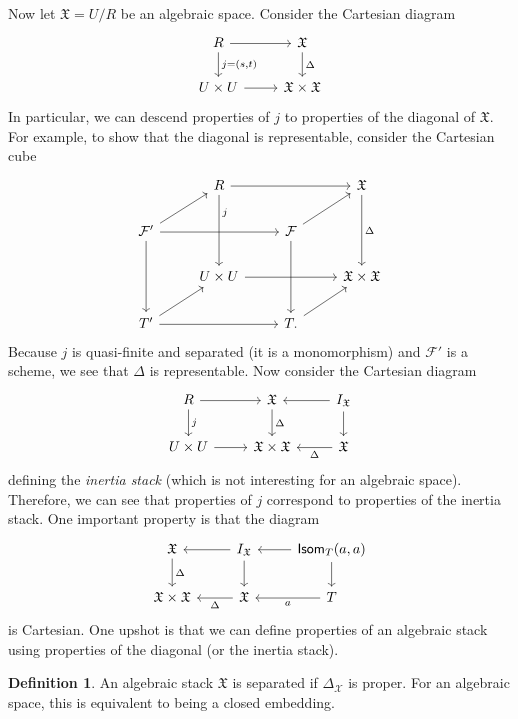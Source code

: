 \documentclass{amsart}
\theoremstyle{definition}
\newtheorem{defn}[thm]{Definition}
\theoremstyle{remark}
\theoremstyle{plain}
\theoremstyle{definition}
\theoremstyle{remark}
\newcommand{\mc}[1]{\mathcal{#1}}
\newcommand{\mf}[1]{\mathfrak{#1}}
\newcommand{\ms}[1]{\mathsf{#1}}
\newcommand{\1}{\mathbf{1}}
\newcommand{\2}{\mathbf{2}}
\newcommand{\3}{\mathbf{3}}
\begin{document}
Now let \(\mf{X} = U/R\) be an algebraic space. Consider the Cartesian diagram
\begin{equation*}
\begin{tikzcd}
    R \ar{r} \ar{d}{j=(s,t)} & \mf{X} \ar{d}{\Delta} \\
    U \times U \ar{r} & \mf{X} \times \mf{X}
\end{tikzcd}
\end{equation*}
In particular, we can descend properties of \(j\) to properties of the diagonal of \(\mf{X}\). For example, to show that the diagonal is representable, consider the Cartesian cube
\begin{equation*}
\begin{tikzcd}
    & R \ar{rr} \ar[dd,"j",near start] & & \mf{X} \ar{dd}{\Delta} \\
    \mc{F}' \ar{ur} \ar{rr} \ar{dd} & & \mc{F} \ar{ur} \ar{dd} \\
    & U \times U \ar{rr} & & \mf{X} \times \mf{X} \\
    T' \ar{ur} \ar{rr} & & T \ar{ur}.
\end{tikzcd}
\end{equation*}
Because \(j\) is quasi-finite and separated (it is a monomorphism) and \(\mc{F}'\) is a scheme, we see that \(\Delta\) is representable. Now consider the Cartesian diagram
\begin{equation*}
\begin{tikzcd}
    R \ar{r} \ar{d}{j} & \mf{X} \ar{d}{\Delta} & I_{\mf{X}} \ar{d} \ar{l} \\
    U \times U \ar{r} & \mf{X} \times \mf{X} & \mf{X} \ar{l}{\Delta}
\end{tikzcd}
\end{equation*}
defining the \textit{inertia stack} (which is not interesting for an algebraic space). Therefore, we can see that properties of \(j\) correspond to properties of the inertia stack. One important property is that the diagram
\begin{equation*}
\begin{tikzcd}
    \mf{X} \ar{d}{\Delta} & I_{\mf{X}} \ar{d} \ar{l} & \ms{Isom}_T(a,a) \ar{d} \ar{l} \\
    \mf{X} \times \mf{X} & \mf{X} \ar{l}{\Delta} & T \ar{l}{a}
\end{tikzcd}
\end{equation*}
is Cartesian. One upshot is that we can define properties of an algebraic stack using properties of the diagonal (or the inertia stack).

\begin{defn}
    An algebraic stack \(\mf{X}\) is separated if \(\Delta_{\mc{X}}\) is proper. For an algebraic space, this is equivalent to being a closed embedding.
\end{defn}
\end{document}
